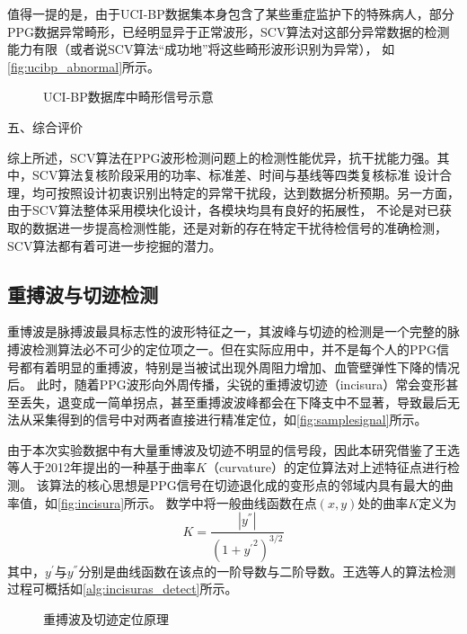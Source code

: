 值得一提的是，由于UCI-BP数据集本身包含了某些重症监护下的特殊病人，部分PPG数据异常畸形，已经明显异于正常波形，SCV算法对这部分异常数据的检测能力有限（或者说SCV算法“成功地”将这些畸形波形识别为异常），
如\autoref{fig:ucibp_abnormal}所示。
\begin{figure}[h]
    \centering
    \quad
    \quad
    \caption{\label{fig:ucibp_abnormal}UCI-BP数据库中畸形信号示意}
\end{figure}

五、综合评价

综上所述，SCV算法在PPG波形检测问题上的检测性能优异，抗干扰能力强。其中，SCV算法复核阶段采用的功率、标准差、时间与基线等四类复核标准
设计合理，均可按照设计初衷识别出特定的异常干扰段，达到数据分析预期。另一方面，由于SCV算法整体采用模块化设计，各模块均具有良好的拓展性，
不论是对已获取的数据进一步提高检测性能，还是对新的存在特定干扰待检信号的准确检测，SCV算法都有着可进一步挖掘的潜力。

\subsection{重搏波与切迹检测}
重博波是脉搏波最具标志性的波形特征之一，其波峰与切迹的检测是一个完整的脉搏波检测算法必不可少的定位项之一\cite{Wang2012}。但在实际应用中，并不是每个人的PPG信号都有着明显的重搏波，特别是当被试出现外周阻力增加、血管壁弹性下降的情况后\cite{mmt}。
此时，随着PPG波形向外周传播，尖锐的重搏波切迹（incisura）常会变形甚至丢失，退变成一简单拐点，甚至重搏波波峰都会在下降支中不显著，导致最后无法从采集得到的信号中对两者直接进行精准定位，如\autoref{fig:samplesignal}所示。

由于本次实验数据中有大量重博波及切迹不明显的信号段，因此本研究借鉴了王选等人于2012年提出的一种基于曲率$K$（curvature）的定位算法对上述特征点进行检测\cite{Wang2012}。
该算法的核心思想是PPG信号在切迹退化成的变形点的邻域内具有最大的曲率值，如\autoref{fig:incisura}所示。
数学中将一般曲线函数在点$(x,y)$处的曲率$K$定义为
\begin{equation}
    \label{equ:curvature}
    K=\frac{|y^{''}|}{{(1+{y^{'}}^2)}^{3/2}}
\end{equation}
其中，$y^{'}$与$y^{''}$分别是曲线函数在该点的一阶导数与二阶导数。王选等人的算法检测过程可概括如\autoref{alg:incisuras_detect}所示\cite{Wang2012}。
\begin{figure}[htbp]
    \centering
    \quad
    \caption[重搏波及切迹定位原理]{\label{fig:incisura}重搏波及切迹定位原理\cite{Wang2012,Su2014}}
\end{figure}

